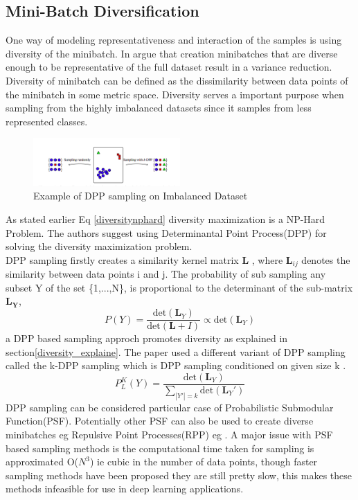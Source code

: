 \documentclass[a4paper,twoside]{iiththesis}
\theoremstyle{definition}
\theoremstyle{definition}
\theoremstyle{remark}
\begin{document}
\subsection{Mini-Batch Diversification}
One way of modeling representativeness and interaction of the samples is using diversity of the minibatch. In \cite{zhangdiversified} argue that creation minibatches that are diverse enough to be representative of the full dataset result in a variance reduction. Diversity of minibatch can be defined as the dissimilarity between data points of the minibatch in some metric space. Diversity serves a important purpose when sampling from the highly imbalanced datasets since it samples from less represented classes. \\
\begin{figure}[!htb] 
\centering
\includegraphics[width=0.5\textwidth] {images/diversity}
\caption{Example of DPP sampling on Imbalanced Dataset}
\label{Dpp_fig}
\end{figure}

As stated earlier Eq \ref{diversitynphard} diversity maximization is a NP-Hard Problem. The authors suggest using  Determinantal Point Process(DPP) for solving the diversity maximization problem. \\ DPP sampling firstly creates a similarity kernel matrix $\mathbf{L}$ , where $\mathbf{L}_{ij}$ denotes the similarity between data points i and j. The probability of sub sampling any subset Y of the set \{1,...,N\}, is proportional to the determinant of the sub-matrix $\mathbf{L_Y}$, 
\begin{equation} 
P(Y) = \frac{\text{det}(\mathbf{L}_Y )} { \text{det}(\mathbf{L}+I)} \propto \text{det}(\mathbf{L}_Y)
\end{equation}
a DPP based sampling approch promotes diversity as explained in section\ref{diversity_explaine}. The paper used a different variant of DPP sampling called the k-DPP sampling which is DPP sampling conditioned on given size k .
\begin{equation}
P_{L} ^ K (Y) = \frac{\text{det}(\mathbf{L}_Y )} { \sum_{|Y'| =k }\text{det}(\mathbf{L}_{Y}')} 
\end{equation}
 DPP sampling can be considered particular case of Probabilistic Submodular Function(PSF). Potentially other PSF can also be used to create diverse minibatches eg Repulsive Point Processes(RPP) eg \cite{zhang2018active}. A major issue with PSF based sampling methods is the computational time taken for sampling is approximated O($N^3$) ie cubic in the number of data points, though faster sampling methods have been proposed they are still pretty slow, this makes these methods infeasible for use in deep learning applications. 
\end{document}
